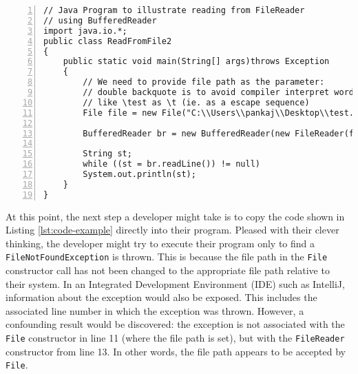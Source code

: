 \centering
\begin{lstlisting}[tabsize=4,caption={File reading java code example from GeeksforGeeks},label={lst:code-example},numbers=left]
// Java Program to illustrate reading from FileReader 
// using BufferedReader 
import java.io.*; 
public class ReadFromFile2 
{ 
	public static void main(String[] args)throws Exception 
	{ 
		// We need to provide file path as the parameter: 
		// double backquote is to avoid compiler interpret words 
		// like \test as \t (ie. as a escape sequence) 
		File file = new File("C:\\Users\\pankaj\\Desktop\\test.txt"); 
		
		BufferedReader br = new BufferedReader(new FileReader(file)); 
		
		String st; 
		while ((st = br.readLine()) != null) 
		System.out.println(st); 
	} 
} 
\end{lstlisting}
\flushleft

At this point, the next step a developer might take is to copy the code shown in Listing \ref{lst:code-example} directly into their program. Pleased with their clever thinking, the developer might try to execute their program only to find a \lstinline{FileNotFoundException} is thrown. This is because the file path in the \lstinline{File} constructor call has not been changed to the appropriate file path relative to their system. In an Integrated Development Environment (IDE) such as IntelliJ, information about the exception would also be exposed. This includes the associated line number in which the exception was thrown. However, a confounding result would be discovered: the exception is not associated with the \lstinline{File} constructor in line 11 (where the file path is set), but with the \lstinline{FileReader} constructor from line 13. In other words, the file path appears to be accepted by \lstinline{File}. \bigbreak

